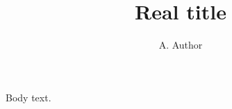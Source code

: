 \documentclass{siamltex704}
\title{Real title}
\author{A. Author}
\begin{document}
\maketitle
Body text.
\end{document}
